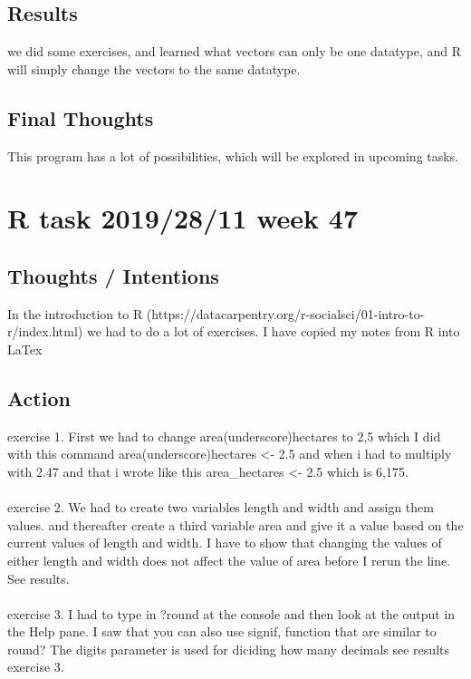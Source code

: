 \documentclass{article}
\begin{document}
\subsection{Results} we did some exercises, and learned what vectors can only be one datatype, and R will simply change the vectors to the same datatype. 
\subsection{Final Thoughts} This program has a lot of possibilities, which will be explored in upcoming tasks.  

\section{R task 2019/28/11 week 47}
\subsection{Thoughts / Intentions} In the introduction to R (https://datacarpentry.org/r-socialsci/01-intro-to-r/index.html) we had to do a lot of exercises. I have copied my notes from R into LaTex\\
\subsection{Action} exercise 1. First we had to change area(underscore)hectares to 2,5 which I did with this command area(underscore)hectares \textless- 2.5 and when i had to multiply with 2.47 and that i wrote like this area\_hectares \textless- 2.5 which is 6,175.\\\\

exercise 2. We had to create two variables length and width and assign them values. and thereafter create a third variable area and give it a value based on the current values of length and width. I have to show that changing the values of either length and width does not affect the value of area before I rerun the line. See results.\\\\

exercise 3. I had to type in ?round at the console and then look at the output in the Help pane. I saw that you can also use signif,  function that are similar to round? The digits parameter is used for diciding how many decimals see results exercise 3. \\\\
\end{document}
